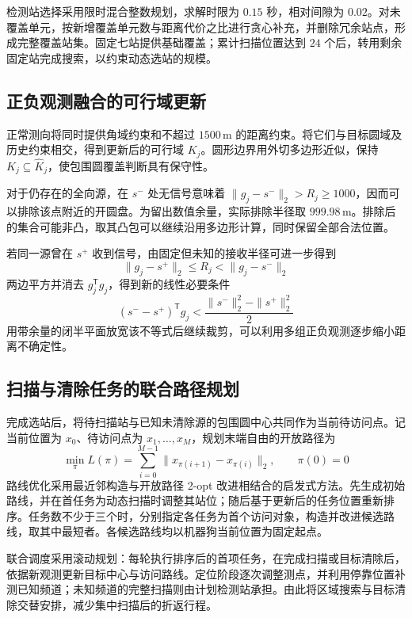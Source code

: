 \documentclass[withoutpreface,bwprint]{cumcmthesis} %
\begin{document}
检测站选择采用限时混合整数规划，求解时限为 $0.15$ 秒，相对间隙为 $0.02$。对未覆盖单元，按新增覆盖单元数与距离代价之比进行贪心补充，并删除冗余站点，形成完整覆盖站集。固定七站提供基础覆盖；累计扫描位置达到 $24$ 个后，转用剩余固定站完成搜索，以约束动态选站的规模。

\subsection{正负观测融合的可行域更新}
正常测向将同时提供角域约束和不超过 $1500\,\mathrm m$ 的距离约束。将它们与目标圆域及历史约束相交，得到更新后的可行域 $K_j$。圆形边界用外切多边形近似，保持 $K_j\subseteq\widehat K_j$，使包围圆覆盖判断具有保守性。

对于仍存在的全向源，在 $s^-$ 处无信号意味着
$\|g_j-s^-\|_2>R_j\geq1000$，因而可以排除该点附近的开圆盘。为留出数值余量，实际排除半径取 $999.98\,\mathrm m$。排除后的集合可能非凸，取其凸包可以继续沿用多边形计算，同时保留全部合法位置。

若同一源曾在 $s^+$ 收到信号，由固定但未知的接收半径可进一步得到
\begin{equation}
 \|g_j-s^+\|_2\leq R_j<\|g_j-s^-\|_2
\end{equation}
两边平方并消去 $g_j^{\mathsf T}g_j$，得到新的线性必要条件
\begin{equation}
 (s^--s^+)^{\mathsf T}g_j
 <\frac{\|s^-\|_2^2-\|s^+\|_2^2}{2}
 \label{eq:b26-positive-negative}
\end{equation}
用带余量的闭半平面放宽该不等式后继续裁剪，可以利用多组正负观测逐步缩小距离不确定性。

\subsection{扫描与清除任务的联合路径规划}
完成选站后，将待扫描站与已知未清除源的包围圆中心共同作为当前待访问点。记当前位置为 $x_0$、待访问点为 $x_1,\ldots,x_M$，规划末端自由的开放路径为
\begin{equation}
 \min_\pi L(\pi)=\sum_{i=0}^{M-1}\|x_{\pi(i+1)}-x_{\pi(i)}\|_2,
 \qquad\pi(0)=0
 \label{eq:b26-open-route}
\end{equation}
路线优化采用最近邻构造与开放路径 2-opt 改进相结合的启发式方法。先生成初始路线，并在首任务为动态扫描时调整其站位；随后基于更新后的任务位置重新排序。任务数不少于三个时，分别指定各任务为首个访问对象，构造并改进候选路线，取其中最短者。各候选路线均以机器狗当前位置为固定起点。

联合调度采用滚动规划：每轮执行排序后的首项任务，在完成扫描或目标清除后，依据新观测更新目标中心与访问路线。定位阶段逐次调整测点，并利用停靠位置补测已知频道；未知频道的完整扫描则由计划检测站承担。由此将区域搜索与目标清除交替安排，减少集中扫描后的折返行程。
\end{document}
